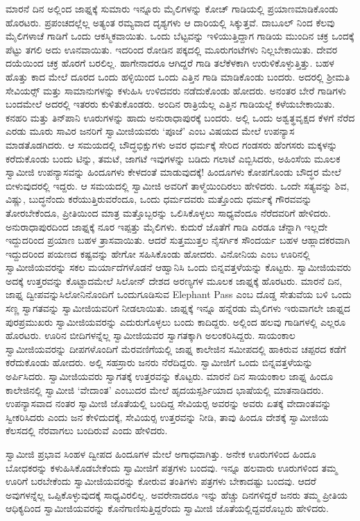  ಮಾರನೆ ದಿನ ಅಲ್ಲಿಂದ ಜಾಫ್ನಕ್ಕೆ ಸುಮಾರು ಇನ್ನೂರು ಮೈಲಿಗಳನ್ನು ಕೋಚ್ ಗಾಡಿಯಲ್ಲಿ ಪ್ರಯಾಣಮಾಡಿಕೊಂಡು ಹೊರಟರು. ಪ್ರಪಂಚದಲ್ಲೆಲ್ಲ ಅತ್ಯಂತ ರಮ್ಯವಾದ ದೃಶ್ಯಗಳು ಆ ದಾರಿಯಲ್ಲಿ ಸಿಕ್ಕುತ್ತವೆ. ದಾಬೂಲ್ ನಿಂದ ಕೆಲವು ಮೈಲಿಗಳಾಚೆ ಗಾಡಿಗೆ ಒಂದು ಆಕಸ್ಮಿಕವಾಯಿತು. ಒಂದು ಬೆಟ್ಟವನ್ನು ಇಳಿಯುತ್ತಿದ್ದಾಗ ಗಾಡಿಯ ಮುಂದಿನ ಚಕ್ರ ಒಂದಕ್ಕೆ ಪೆಟ್ಟು ತಗಲಿ ಅದು ಊನವಾಯಿತು. ಇದರಿಂದ ರೋಡಿನ ಪಕ್ಕದಲ್ಲಿ ಮೂರುಗಂಟೆಗಳು ನಿಲ್ಲಬೇಕಾಯಿತು. ದೇವರ ದಯೆಯಿಂದ ಚಕ್ರ ಹೊರಗೆ ಬರಲಿಲ್ಲ. ಹಾಗೇನಾದರೂ ಆಗಿದ್ದರೆ ಗಾಡಿ ತಲೆಕೆಳಕಾಗಿ ಉರುಳಿಕೊಳ್ಳುತ್ತಿತ್ತು. ಬಹಳ ಹೊತ್ತು ಕಾದ ಮೇಲೆ ದೂರದ ಒಂದು ಹಳ್ಳಿಯಿಂದ ಒಂದು ಎತ್ತಿನ ಗಾಡಿ ಮಾಡಿಕೊಂಡು ಬಂದರು. ಅದರಲ್ಲಿ ಶ‍್ರೀಮತಿ ಸೇವಿಯರ್ಸ್‍‍ ಮತ್ತು ಸಾಮಾನುಗಳನ್ನು ಕಳುಹಿಸಿ ಉಳಿದವರು ನಡೆದುಕೊಂಡು ಹೋದರು. ಅನಂತರ ಬೇರೆ ಗಾಡಿಗಳು ಬಂದಮೇಲೆ ಅದರಲ್ಲಿ ಇತರರು ಕುಳಿತುಕೊಂಡರು. ಅಂದಿನ ರಾತ್ರಿಯೆಲ್ಲ ಎತ್ತಿನ ಗಾಡಿಯಲ್ಲೆ ಕಳೆಯಬೇಕಾಯಿತು. ಕನಹರಿ ಮತ್ತು ತಿನ್‍ಪಾನಿ ಊರುಗಳನ್ನು ಹಾದು ಅನುರಾಧಾಪುರಕ್ಕೆ ಬಂದರು. ಅಲ್ಲಿ ಒಂದು ಅಶ್ವತ್ಥವೃಕ್ಷದ ಕೆಳಗೆ ನೆರೆದ ಎರಡು ಮೂರು ಸಾವಿರ ಜನರಿಗೆ ಸ್ವಾಮೀಜಿಯವರು ‘ಪೂಜೆ’ ಎಂಬ ವಿಷಯದ ಮೇಲೆ ಉಪನ್ಯಾಸ ಮಾಡತೊಡಗಿದರು. ಆ ಸಮಯದಲ್ಲಿ ಬೌದ್ಧಭಿಕ್ಷುಗಳು ಅವರ ಧರ್ಮಕ್ಕೆ ಸೇರಿದ ಗಂಡಸರು ಹೆಂಗಸರು ಮಕ್ಕಳನ್ನು ಕರೆದುಕೊಂಡು ಬಂದು ಟಿನ್ನು, ತಮಟೆ, ಜಾಗಟೆ ಇವುಗಳನ್ನು ಬಡಿದು ಗಲಾಟೆ ಎಬ್ಬಿಸಿದರು, ಅಹಿಂಸೆಯ ಮೂಲಕ ಸ್ವಾಮೀಜಿ ಉಪನ್ಯಾಸವನ್ನು ಹಿಂದೂಗಳು ಕೇಳದಂತೆ ಮಾಡುವುದಕ್ಕೆ‌! ಹಿಂದೂಗಳು ಕೋಪಗೊಂಡು ಬೌದ್ಧರ ಮೇಲೆ ಬೀಳುವುದರಲ್ಲಿ ಇದ್ದರು. ಆ ಸಮಯದಲ್ಲಿ ಸ್ವಾಮೀಜಿ ಅವರಿಗೆ ತಾಳ್ಮೆಯಿಂದಿರಲು ಹೇಳಿದರು. ಒಂದೇ ಸತ್ಯವನ್ನು ಶಿವ, ವಿಷ್ಣು, ಬುದ್ಧನೆಂದು ಕರೆಯುತ್ತಿರುವರೆಂದೂ, ಒಂದು ಧರ್ಮದವರು ಮತ್ತೊಂದು ಧರ್ಮಕ್ಕೆ ಗೌರವವನ್ನು ತೋರಬೇಕೆಂದೂ, ಪ್ರೀತಿಯಿಂದ ಮಾತ್ರ ಮತ್ತೊಬ್ಬರನ್ನು ಒಲಿಸಿಕೊಳ್ಳಲು ಸಾಧ್ಯವೆಂದೂ ನೆರೆದವರಿಗೆ ಹೇಳಿದರು. ಅನುರಾಧಾಪುರದಿಂದ ಜಾಫ್ನಕ್ಕೆ ನೂರ ಇಪ್ಪತ್ತು ಮೈಲಿಗಳು. ಕುದುರೆ ಜೊತೆಗೆ ಗಾಡಿ ಎರಡೂ ಚೆನ್ನಾಗಿ ಇಲ್ಲದೇ ಇದ್ದುದರಿಂದ ಪ್ರಯಾಣ ಬಹಳ ತ್ರಾಸವಾಯಿತು. ಆದರೆ ಸುತ್ತಮುತ್ತಲ ನೈಸರ್ಗಿಕ ಸೌಂದರ್ಯ ಬಹಳ ಆಹ್ಲಾದಕರವಾಗಿ ಇದ್ದುದರಿಂದ ಪಯಣದ ಕಷ್ಟವನ್ನು ಹೇಗೋ ಸಹಿಸಿಕೊಂಡು ಹೋದರು. ವಿನೋನಿಯ ಎಂಬ ಊರಿನಲ್ಲಿ ಸ್ವಾಮೀಜಿಯವರನ್ನು ಸಕಲ ಮರ್ಯಾದೆಗಳೊಡನೆ ಆಹ್ವಾನಿಸಿ ಒಂದು ಬಿನ್ನವತ್ತಳೆಯನ್ನು ಕೊಟ್ಟರು. ಸ್ವಾಮೀಜಿಯವರು ಅದಕ್ಕೆ ಉತ್ತರವನ್ನು ಕೊಟ್ಟಾದಮೇಲೆ ಸಿಲೋನ್ ದೇಶದ ಅರಣ್ಯಗಳ ಮೂಲಕ ಜಾಫ್ನಕ್ಕೆ ಹೊರಟರು. ಮಾರನೆ ದಿನ, ಜಾಫ್ನ ದ್ವೀಪವನ್ನು\break ಸಿಲೋನಿನೊಂದಿಗೆ ಒಂದುಗೂಡಿಸುವ Elephant Pass ಎಂಬ ದೊಡ್ಡ ಸೇತುವೆಯ ಬಳಿ ಒಂದು ಸಣ್ಣ ಸ್ವಾಗತವನ್ನು ಸ್ವಾಮೀಜಿಯವರಿಗೆ ನೀಡಲಾಯಿತು. ಜಾಫ್ನಕ್ಕೆ ಇನ್ನೂ ಹನ್ನೆರಡು ಮೈಲಿಗಳು ಇರುವಾಗಲೇ ಜಾಫ್ನದ ಪುರಪ್ರಮುಖರು ಸ್ವಾಮೀಜಿಯವರನ್ನು ಎದುರುಗೊಳ್ಳಲು ಬಂದು ಕಾದಿದ್ದರು. ಅಲ್ಲಿಂದ ಹಲವು ಗಾಡಿಗಳಲ್ಲಿ ಎಲ್ಲರೂ ಹೊರಟರು. ಊರಿನ ಬೀದಿಗಳನ್ನೆಲ್ಲ ಸ್ವಾಮೀಜಿಯವರ ಸ್ವಾಗತಕ್ಕಾಗಿ ಅಲಂಕರಿಸಿದ್ದರು. ಸಾಯಂಕಾಲ ಸ್ವಾಮೀಜಿಯವರನ್ನು ದೀಪಗಳೊಂದಿಗೆ ಮೆರವಣಿಗೆಯಲ್ಲಿ ಜಾಫ್ನ ಕಾಲೇಜಿನ ಸಮೀಪದಲ್ಲಿ ಹಾಕಿರುವ ಚಪ್ಪರದ ಕಡೆಗೆ ಕರೆದುಕೊಂಡು ಹೋದರು. ಅಲ್ಲಿ ಸಹಸ್ರಾರು ಜನರು ನೆರೆದಿದ್ದರು. ಸ್ವಾಮೀಜಿಗೆ ಒಂದು ಬಿನ್ನವತ್ತಳೆಯನ್ನು ಅರ್ಪಿಸಿದರು. ಸ್ವಾಮೀಜಿಯವರು ಸ್ವಾಗತಕ್ಕೆ ಉತ್ತರವನ್ನು ಕೊಟ್ಟರು. ಮಾರನೆ ದಿನ ಸಾಯಂಕಾಲ ಜಾಫ್ನ ಹಿಂದೂ ಕಾಲೇಜಿನಲ್ಲಿ ಸ್ವಾಮೀಜಿ ‘ವೇದಾಂತ’ ಎಂಬುದರ ಮೇಲೆ ಹೃದಯಸ್ಪರ್ಶಿಯಾದ ಭಾಷೆಯಲ್ಲಿ ಮಾತನಾಡಿದರು. ಉಪನ್ಯಾಸವಾದ ನಂತರ ಸ್ವಾಮೀಜಿ ಜೊತೆಯಲ್ಲಿ ಬಂದಿದ್ದ ಸೇವಿಯರ‍್ಸ ಅವರನ್ನು ಅವರು ಏತಕ್ಕೆ ವೇದಾಂತವನ್ನು ಸ್ವೀಕರಿಸಿದರು ಎಂದು ಜನ ಕೇಳಿದುದಕ್ಕೆ, ಸೇವಿಯರ‍್ಸ ಉತ್ತರವನ್ನು ನೀಡಿ, ತಾವು ಹಿಂದೂ ದೇಶಕ್ಕೆ ಸ್ವಾಮೀಜಿಯ ಕೆಲಸದಲ್ಲಿ ನೆರವಾಗಲು ಬಂದಿರುವೆ ಎಂದು ಹೇಳಿದರು. 

 ಸ್ವಾಮೀಜಿ ಪ್ರಭಾವ ಸಿಂಹಳ ದ್ವೀಪದ ಹಿಂದೂಗಳ ಮೇಲೆ ಅಗಾಧವಾಗಿತ್ತು. ಅನೇಕ ಊರುಗಳಿಂದ ಹಿಂದೂ ಬೋಧಕರನ್ನು ಕಳುಹಿಸಿಕೊಡಬೇಕೆಂದು ಸ್ವಾಮೀಜಿಗೆ ಪತ್ರಗಳು ಬಂದವು. ಇನ್ನೂ ಹಲವಾರು ಊರುಗಳಿಂದ ತಮ್ಮ ಊರಿಗೆ ಬರಬೇಕೆಂದು ಸ್ವಾಮೀಜಿಯವರನ್ನು ಕೋರುವ ತಂತಿಗಳು ಪತ್ರಗಳು ಬೇಕಾದಷ್ಟು ಬಂದವು. ಆದರೆ ಅವುಗಳನ್ನೆಲ್ಲ ಒಪ್ಪಿಕೊಳ್ಳುವುದಕ್ಕೆ ಸಾಧ್ಯವಿರಲಿಲ್ಲ. ಅವರೇನಾದರೂ ಇನ್ನು ಹೆಚ್ಚು ದಿನಗಳಿದ್ದರೆ ಜನರು ತಮ್ಮ ಪ್ರೀತಿಯ ಆಧಿಕ್ಯದಿಂದ ಸ್ವಾಮೀಜಿಯವರನ್ನು ಕೊನೆಗಾಣಿಸುತ್ತಿದ್ದರೆಂದು ಸ್ವಾಮೀಜಿ ಜೊತೆಯಲ್ಲಿದ್ದವರೊಬ್ಬರು ಹೇಳಿದರು. 

